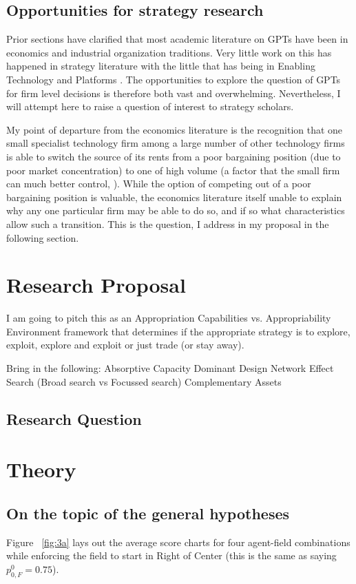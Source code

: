 \documentclass[12pt,letterpaper]{article}
\begin{document}
\subsection{Opportunities for strategy research}
Prior sections have clarified that most academic literature on GPTs have been in economics and industrial organization traditions. Very little work on this has happened in strategy literature with the little that has being in Enabling Technology and Platforms \cite{Teece2012a}. The opportunities to explore the question of GPTs for firm level decisions is therefore both vast and overwhelming. Nevertheless, I will attempt here to raise a question of interest to strategy scholars.

My point of departure from the economics literature is the recognition that one small  specialist technology firm among a large number of other technology firms is able to switch the source of its rents from a poor bargaining position (due to poor market concentration) to one of high volume (a factor that the small firm can much better control, \cite{Gambardella2010}). While the option of competing out of a poor bargaining position is valuable, the economics literature itself unable to explain why any one particular firm may be able to do so, and if so what characteristics allow such a transition. This is the question, I address in my proposal in the following section.


\section{Research Proposal}
I am going to pitch this as an Appropriation Capabilities vs. Appropriability Environment framework that determines if the appropriate strategy is to explore, exploit, explore and exploit or just trade (or stay away).

Bring in the following:
Absorptive Capacity
Dominant Design
Network Effect
Search (Broad search vs Focussed search)
Complementary Assets
\par


\subsection{Research Question}


\section{Theory}
\subsection{On the topic of the general hypotheses}
 Figure ~\ref{fig:3a} lays out the average score charts for four agent-field combinations while enforcing the field to start in Right of Center (this is the same as saying $p_{0,F}^0 = 0.75$). 
\end{document}
